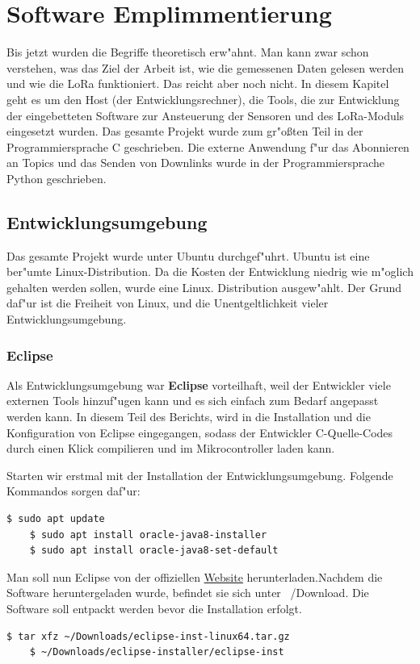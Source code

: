 \chapter{Software Emplimmentierung}\label{Soft-Ent}
Bis jetzt wurden die Begriffe theoretisch erw"ahnt. Man kann zwar schon 
verstehen, was das Ziel der Arbeit ist, wie die gemessenen Daten gelesen 
werden und wie die LoRa funktioniert. Das reicht aber noch nicht. 
In diesem Kapitel geht es um den Host (der Entwicklungsrechner), die 
Tools, die zur Entwicklung der eingebetteten Software zur Ansteuerung 
der Sensoren und des LoRa-Moduls eingesetzt wurden. Das gesamte Projekt 
wurde zum gr"o\ss{}ten Teil in der Programmiersprache C geschrieben. 
Die externe Anwendung f"ur das Abonnieren an Topics und das Senden von
Downlinks wurde in der Programmiersprache Python geschrieben.

\section{Entwicklungsumgebung}
Das gesamte Projekt wurde unter Ubuntu durchgef"uhrt. Ubuntu ist eine 
ber"umte Linux-Distribution. Da die Kosten der Entwicklung niedrig wie 
m"oglich gehalten werden sollen, wurde eine Linux. Distribution 
ausgew"ahlt. Der Grund daf"ur ist die Freiheit von Linux, und die 
Unentgeltlichkeit vieler Entwicklungsumgebung. 

\subsection{Eclipse}

Als Entwicklungsumgebung war \textbf{Eclipse} vorteilhaft, weil der 
Entwickler viele externen Tools hinzuf"ugen kann und es sich einfach 
zum Bedarf angepasst werden kann. In diesem Teil des Berichts, wird in 
die Installation und die Konfiguration von Eclipse eingegangen, sodass  
der Entwickler C-Quelle-Codes durch einen Klick compilieren und im 
Mikrocontroller laden kann. 

\vspace{2cm}
Starten wir erstmal mit der Installation der Entwicklungsumgebung. 
Folgende Kommandos sorgen daf"ur:

\begin{lstlisting}[frame=single]
	$ sudo apt update
	$ sudo apt install oracle-java8-installer
	$ sudo apt install oracle-java8-set-default
\end{lstlisting}

Man soll nun Eclipse von der offiziellen
\href{https://www.eclipse.org/downloads/}{Website}  herunterladen.Nachdem 
die Software heruntergeladen wurde, befindet sie sich unter 
~/Download. Die Software soll entpackt werden bevor die Installation 
erfolgt.
\begin{lstlisting}[frame=single]
	$ tar xfz ~/Downloads/eclipse-inst-linux64.tar.gz
	$ ~/Downloads/eclipse-installer/eclipse-inst
\end{lstlisting}

